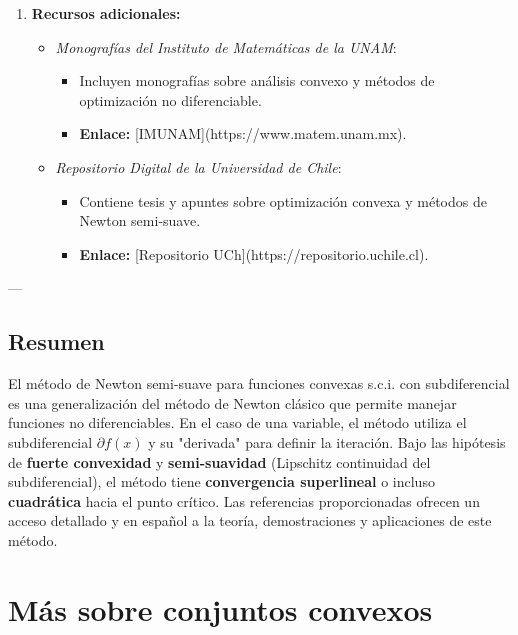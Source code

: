 \documentclass[12pt]{book}
\theoremstyle{definition}
\theoremstyle{plain}
\theoremstyle{remark}
\begin{document}
\begin{enumerate}
    \item \textbf{Recursos adicionales:}
      \begin{itemize}
        \item \textit{Monografías del Instituto de Matemáticas de la UNAM}:
          \begin{itemize}
            \item Incluyen monografías sobre análisis convexo y métodos de optimización no diferenciable.
            \item \textbf{Enlace:} [IMUNAM](https://www.matem.unam.mx).
          \end{itemize}

        \item \textit{Repositorio Digital de la Universidad de Chile}:
          \begin{itemize}
            \item Contiene tesis y apuntes sobre optimización convexa y métodos de Newton semi-suave.
            \item \textbf{Enlace:} [Repositorio UCh](https://repositorio.uchile.cl).
          \end{itemize}
      \end{itemize}
\end{enumerate}

---
\section*{Resumen}

El método de Newton semi-suave para funciones convexas s.c.i. con subdiferencial es una generalización del método de Newton clásico que permite manejar funciones no diferenciables. En el caso de una variable, el método utiliza el subdiferencial \( \partial f(x) \) y su "derivada" para definir la iteración. Bajo las hipótesis de \textbf{fuerte convexidad} y \textbf{semi-suavidad} (Lipschitz continuidad del subdiferencial), el método tiene \textbf{convergencia superlineal} o incluso \textbf{cuadrática} hacia el punto crítico. Las referencias proporcionadas ofrecen un acceso detallado y en español a la teoría, demostraciones y aplicaciones de este método.

\chapter{M\'as sobre conjuntos convexos} %

\end{document}
